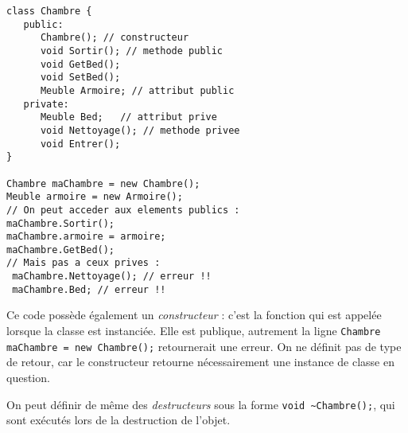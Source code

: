 \documentclass[abstracton]{scrartcl}
\begin{document}
\begin{lstlisting}
class Chambre {
   public:
      Chambre(); // constructeur
	  void Sortir(); // methode public
      void GetBed();
      void SetBed();
      Meuble Armoire; // attribut public
   private:
   	  Meuble Bed;   // attribut prive
	  void Nettoyage(); // methode privee
      void Entrer();
}

Chambre maChambre = new Chambre();
Meuble armoire = new Armoire();
// On peut acceder aux elements publics :
maChambre.Sortir();
maChambre.armoire = armoire;
maChambre.GetBed();
// Mais pas a ceux prives :
 maChambre.Nettoyage(); // erreur !!
 maChambre.Bed; // erreur !!
\end{lstlisting}

Ce code possède également un \emph{constructeur} : c'est la fonction qui est appelée lorsque la classe est instanciée. Elle est publique, autrement la ligne \lstinline{Chambre maChambre = new Chambre();} retournerait une erreur. On ne définit pas de type de retour, car le constructeur retourne nécessairement une instance de classe en question.

On peut définir de même des \emph{destructeurs} sous la forme \lstinline{void ~Chambre();}, qui sont exécutés lors de la destruction de l'objet.
\end{document}
